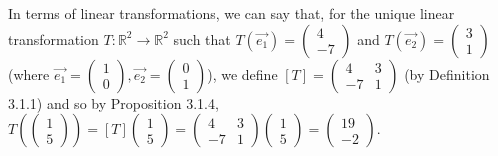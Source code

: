 \documentclass[12pt]{article}
\newenvironment{problem}[2][Problem]
{
	\begin{trivlist} 
		\item[\hskip \labelsep {\bfseries #1 #2:}]
	}
{
	\end{trivlist}
	}
\newenvironment{solution}[1][Solution]
{
	\begin{trivlist} 
		\item[\hskip \labelsep {\itshape #1:}]
	}
	{
	\end{trivlist}
}
\begin{document}
\begin{problem}{2}
\begin{solution}
In terms of linear transformations, we can say that, for the unique linear transformation $T:\mathbb{R}^2 \to \mathbb{R}^2$ such that $T(\vec{e_{1}})=\begin{pmatrix} 4\\-7\end{pmatrix}$ and $T(\vec{e_{2}})=\begin{pmatrix} 3\\1\end{pmatrix}$ (where $\vec{e_{1}}=\begin{pmatrix} 1\\0\end{pmatrix},\vec{e_{2}}=\begin{pmatrix} 0\\1\end{pmatrix}$), we define $[T]=\begin{pmatrix}4 & 3 \\ -7 & 1\end{pmatrix}$ (by Definition 3.1.1) and so by Proposition 3.1.4, $T\left(\begin{pmatrix}1\\5\end{pmatrix}\right)=[T]\begin{pmatrix}1\\5\end{pmatrix}=\begin{pmatrix}4 & 3 \\ -7 & 1\end{pmatrix} \begin{pmatrix}1\\5\end{pmatrix}=\begin{pmatrix}19\\ -2\end{pmatrix}$.
\end{solution}
\end{problem}
\end{document}
